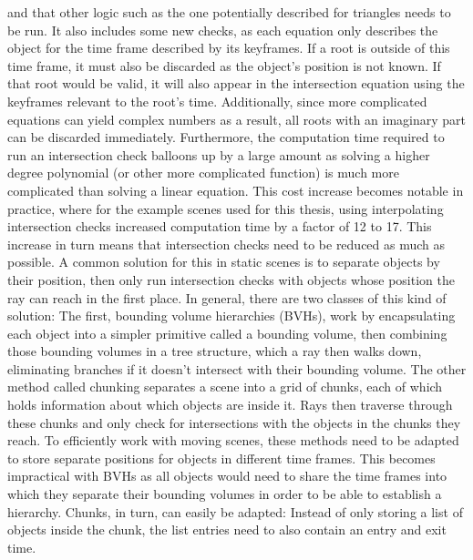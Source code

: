 and that other logic such as the one potentially described for triangles needs to be run.
It also includes some new checks,
as each equation only describes the object for the time frame described by its keyframes.
If a root is outside of this time frame,
it must also be discarded as the object's position is not known.
If that root would be valid,
it will also appear in the intersection equation using the keyframes relevant to the root's time.
Additionally, since more complicated equations can yield complex numbers as a result,
all roots with an imaginary part can be discarded immediately.
\newline
Furthermore, the computation time required to run an intersection check
balloons up by a large amount as solving a higher degree polynomial (or other more complicated function)
is much more complicated than solving a linear equation.
This cost increase becomes notable in practice, where for the example scenes used for this thesis,
using interpolating intersection checks increased computation time by a factor of 12 to 17.
\newline
This increase in turn means that intersection checks need to be reduced as much as possible.
A common solution for this in static scenes is to separate objects by their position,
then only run intersection checks with objects whose position the ray can reach in the first place.
\newline
In general, there are two classes of this kind of solution:
The first, bounding volume hierarchies (BVHs), work by encapsulating each object into a simpler primitive called a bounding volume,
then combining those bounding volumes in a tree structure,
which a ray then walks down, eliminating branches if it doesn't intersect with their bounding volume.
The other method called chunking separates a scene into a grid of chunks,
each of which holds information about which objects are inside it.
Rays then traverse through these chunks and only check for intersections with the objects in the chunks they reach.
\newline
To efficiently work with moving scenes,
these methods need to be adapted to store separate positions for objects in different time frames.
This becomes impractical with BVHs as all objects would need to share the time frames
into which they separate their bounding volumes in order to be able to establish a hierarchy.
\newline
Chunks, in turn, can easily be adapted:
Instead of only storing a list of objects inside the chunk,
the list entries need to also contain an entry and exit time.
